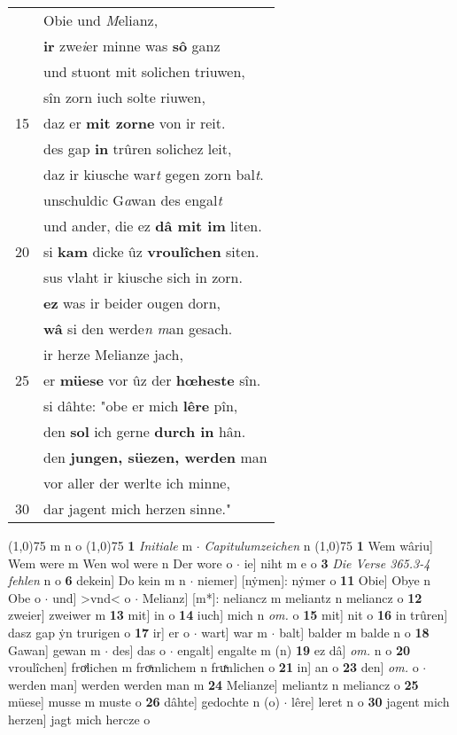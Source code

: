 \documentclass[8pt,a4paper,notitlepage]{article}
\begin{document}
\begin{table}[ht]
\begin{minipage}[t]{0.5\linewidth}
\begin{tabular}{rl}
 & Obie und \textit{M}elianz,\\ 
 & \textbf{ir} zwe\textit{i}er minne was \textbf{sô} ganz\\ 
 & und stuont mit solichen triuwen,\\ 
 & sîn zorn iuch solte riuwen,\\ 
15 & daz er \textbf{mit zorne} von ir reit.\\ 
 & des gap \textbf{in} trûren solichez leit,\\ 
 & daz ir kiusche war\textit{t} gegen zorn bal\textit{t}.\\ 
 & unschuldic G\textit{a}wan des engal\textit{t}\\ 
 & und ander, die ez \textbf{dâ mit im} liten.\\ 
20 & si \textbf{kam} dicke ûz \textbf{vroulîchen} siten.\\ 
 & sus vlaht ir kiusche sich in zorn.\\ 
 & \textbf{ez} was ir beider ougen dorn,\\ 
 & \textbf{wâ} si den werde\textit{n m}an gesach.\\ 
 & ir herze Melianze jach,\\ 
25 & er \textbf{müese} vor ûz der \textbf{hœheste} sîn.\\ 
 & si dâhte: "obe er mich \textbf{lêre} pîn,\\ 
 & den \textbf{sol} ich gerne \textbf{durch in} hân.\\ 
 & den \textbf{jungen, süezen, werden} man\\ 
 & vor aller der werlte ich minne,\\ 
30 & dar jagent mich herzen sinne."\\ 
\end{tabular}
\scriptsize
\line(1,0){75} \newline
m n o \newline
\line(1,0){75} \newline
\textbf{1} \textit{Initiale} m   $\cdot$ \textit{Capitulumzeichen} n  \newline
\line(1,0){75} \newline
\textbf{1} Wem wâriu] Wem were m Wen wol were n Der wore o  $\cdot$ ie] niht m e o \textbf{3} \textit{Die Verse 365.3-4 fehlen} n o  \textbf{6} dekein] Do kein m n  $\cdot$ niemer] [nẏmen]: nẏmer o \textbf{11} Obie] Obye n Obe o  $\cdot$ und] >vnd< o  $\cdot$ Melianz] [m*]: neliancz m meliantz n meliancz o \textbf{12} zweier] zweiwer m \textbf{13} mit] in o \textbf{14} iuch] mich n \textit{om.} o \textbf{15} mit] nit o \textbf{16} in trûren] dasz gap ẏn trurigen o \textbf{17} ir] er o  $\cdot$ wart] war m  $\cdot$ balt] balder m balde n o \textbf{18} Gawan] gewan m  $\cdot$ des] das o  $\cdot$ engalt] engalte m (n) \textbf{19} ez dâ] \textit{om.} n o \textbf{20} vroulîchen] froͯlichen m froͯmlichem n fruͯnlichen o \textbf{21} in] an o \textbf{23} den] \textit{om.} o  $\cdot$ werden man] werden werden man m \textbf{24} Melianze] meliantz n meliancz o \textbf{25} müese] musse m muste o \textbf{26} dâhte] gedochte n (o)  $\cdot$ lêre] leret n o \textbf{30} jagent mich herzen] jagt mich hercze o \newline

\end{minipage}
\end{table}
\end{document}
